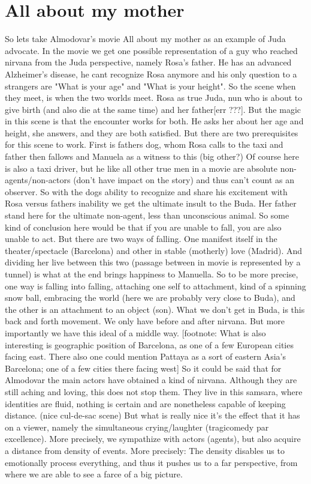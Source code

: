 \documentclass[10pt]{book}
\begin{document}
\section{All about my mother}
So lets take Almodovar's movie All about my mother as an example of Juda advocate. In the movie we get one possible representation of a guy who reached nirvana from the Juda perspective, namely Rosa's father. He has an advanced Alzheimer's disease, he cant recognize Rosa anymore and his only question to a strangers are "What is your age" and "What is your height". So the scene when they meet, is when the two worlds meet. Rosa as true Juda, nun who is about to give birth (and also die at the same time) and her father[err ???]. But the magic in this scene is that the encounter works for both. He asks her about her age and height, she answers, and they are both satisfied. But there are two prerequisites for this scene to work. First is fathers dog, whom Rosa calls to the taxi and father then fallows and Manuela as a witness to this (big other?) Of course here is also a taxi driver, but he like all other true men in a movie are absolute non-agents/non-actors (don't have impact on the story) and thus can't count as an observer. So with the dogs ability to recognize and share his excitement with Rosa versus fathers inability we get the ultimate insult to the Buda. Her father stand here for the ultimate non-agent, less than unconscious animal. 
So some kind of conclusion here would be that if you are unable to fall, you are also unable to act. But there are two ways of falling. One manifest itself in the theater/spectacle (Barcelona) and other in stable (motherly) love (Madrid). And dividing her live between this two (passage between in movie is represented by a tunnel) is what at the end brings happiness to Manuella. So to be more precise, one way is falling into falling, attaching one self to attachment, kind of a spinning snow ball, embracing the world (here we are probably very close to Buda), and the other is an attachment to an object (son). What we don't get in Buda, is this back and forth movement. We only have before and after nirvana. But more importantly we have this ideal of a middle way. [footnote: What is also interesting is geographic position of Barcelona, as one of a few European cities facing east. There also one could mention Pattaya as a sort of eastern Asia's Barcelona; one of a few cities there facing west]
So it could be said that for Almodovar the main actors have obtained a kind of nirvana. Although they are still aching and loving, this does not stop them. They live in this samsara, where identities are fluid, nothing is certain and are nonetheless capable of keeping distance. (nice cul-de-sac scene) But what is really nice it's the effect that it has on a viewer, namely the simultaneous crying/laughter (tragicomedy par excellence). More precisely, we sympathize with actors (agents), but also acquire a distance from density of events. More precisely: The density disables us to emotionally process everything, and thus it pushes us to a far perspective, from where we are able to see a farce of a big picture.
\end{document}
